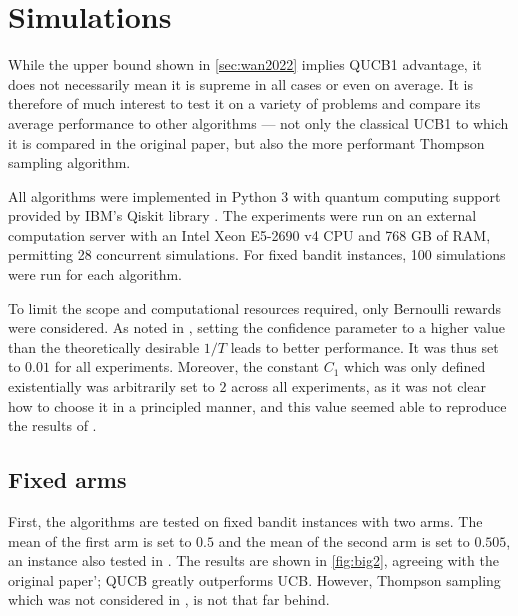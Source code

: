 \chapter{Simulations}
\label{sec:simulations}

While the upper bound shown in \cref{sec:wan2022} implies QUCB1 advantage, it does not necessarily mean it is supreme in all cases or even on average.
It is therefore of much interest to test it on a variety of problems and compare its average performance to other algorithms — not only the classical UCB1 to which it is compared in the original paper, but also the more performant Thompson sampling algorithm.

All algorithms were implemented in Python 3 \autocite{python} with quantum computing support provided by IBM's Qiskit library \autocite{qiskit}.
The experiments were run on an external computation server with an Intel Xeon E5-2690 v4 CPU and 768 GB of RAM, permitting 28 concurrent simulations.
For fixed bandit instances, 100 simulations were run for each algorithm.

To limit the scope and computational resources required, only Bernoulli rewards were considered.
As noted in \autocite{wan2022}, setting the confidence parameter to a higher value than the theoretically desirable $1/T$ leads to better performance.
It was thus set to $0.01$ for all experiments.
Moreover, the constant $C_1$ which was only defined existentially was arbitrarily set to $2$ across all experiments, as it was not clear how to choose it in a principled manner, and this value seemed able to reproduce the results of \autocite{wan2022}.

\section{Fixed arms}
First, the algorithms are tested on fixed bandit instances with two arms.
The mean of the first arm is set to $0.5$ and the mean of the second arm is set to $0.505$, an instance also tested in \autocite{wan2022}.
The results are shown in \cref{fig:big2}, agreeing with the original paper'; QUCB greatly outperforms UCB.
However, Thompson sampling which was not considered in \autocite{wan2022}, is not that far behind.

